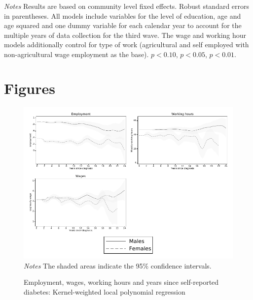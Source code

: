 \documentclass[12pt,english]{article}
\begin{document}
\begin{table}[p]
\begin{center}
\begin{adjustbox}{max width=\linewidth}
\begin{threeparttable}
{\begin{tabular}{l*{6}{S
								S}}
						\bottomrule
					\end{tabular}
					\begin{tablenotes}
						\item \footnotesize \textit{Notes} Results are based on community level fixed effects. Robust standard errors in parentheses. All models include variables for the level of education, age and age squared and one dummy variable for each calendar year to account for the multiple years of data collection for the third wave. The wage and working hour models additionally control for type of work (agricultural and self employed with non-agricultural wage employment as the base). \sym{*} \(p<0.10\), \sym{**} \(p<0.05\), \sym{***} \(p<0.01\).
					\end{tablenotes}
				}
			\end{threeparttable}
		\end{adjustbox}
	\end{center}
\end{table}
\clearpage

\setcounter{figure}{0}
\setcounter{page}{1}
\renewcommand{\thefigure}{\arabic{figure}}
\section*{Figures}


\begin{figure}[!ht]
	\caption{\label{fig:Kernel-weighted-local-polynomial_comb}Employment, wages, working hours and years since self-reported diabetes:  Kernel-weighted local polynomial regression}%
	\begin{center}
		\includegraphics[width=\linewidth]{figures/lpoly_combined.pdf}\\
		\footnotesize{\textit{Notes} The shaded areas indicate the 95\% confidence intervals.}
	\end{center}
\end{figure}
\end{document}
